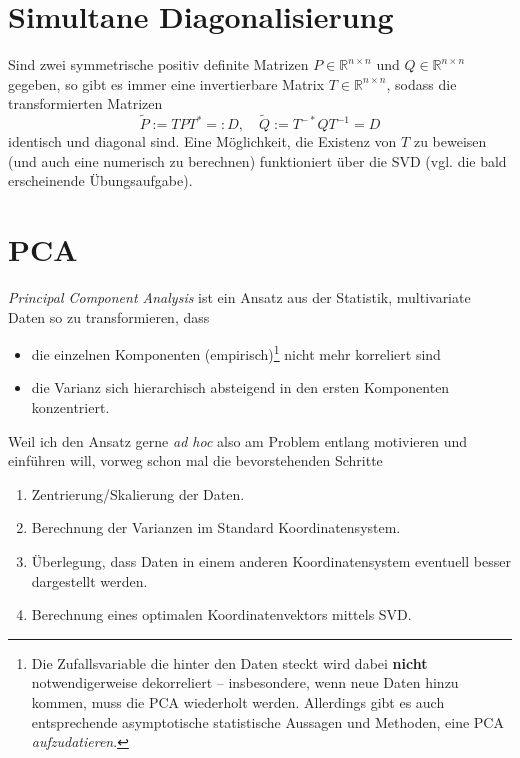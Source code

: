 \documentclass[
]{book}
\providecommand{\tightlist}{%
  \setlength{\itemsep}{0pt}\setlength{\parskip}{0pt}}
\theoremstyle{definition}
\theoremstyle{definition}
\theoremstyle{definition}
\theoremstyle{definition}
\theoremstyle{remark}
\begin{document}
\hypertarget{simultane-diagonalisierung}{%
\section{Simultane Diagonalisierung}\label{simultane-diagonalisierung}}

Sind zwei symmetrische positiv definite Matrizen \(P \in \mathbb R^{n\times n}\)
und \(Q\in \mathbb R^{n\times n}\) gegeben, so gibt es immer eine invertierbare
Matrix \(T\in \mathbb R^{n\times n}\), sodass die transformierten Matrizen
\begin{equation*}
\tilde P := TPT^*=: D, \quad \tilde Q := T^{-*}QT^{-1} = D
\end{equation*}
identisch und diagonal sind.
Eine Möglichkeit, die Existenz von \(T\) zu
beweisen (und auch eine numerisch zu berechnen) funktioniert über die SVD
(vgl. die bald erscheinende Übungsaufgabe).

\hypertarget{pca}{%
\section{PCA}\label{pca}}

\emph{Principal Component Analysis} ist ein Ansatz aus der Statistik, multivariate Daten so zu
transformieren, dass

\begin{itemize}
\tightlist
\item
  die einzelnen Komponenten (empirisch)\footnote{Die Zufallsvariable die hinter den
    Daten steckt wird dabei \textbf{nicht} notwendigerweise dekorreliert -- insbesondere, wenn
    neue Daten hinzu kommen, muss die PCA wiederholt werden. Allerdings gibt es
    auch entsprechende asymptotische statistische Aussagen und Methoden, eine PCA
    \emph{aufzudatieren}.} nicht mehr korreliert sind
\item
  die Varianz sich hierarchisch absteigend in den ersten Komponenten konzentriert.
\end{itemize}

Weil ich den Ansatz gerne \emph{ad hoc} also am Problem entlang motivieren und einführen will, vorweg schon mal die bevorstehenden Schritte

\begin{enumerate}
\def\labelenumi{\arabic{enumi}.}
\tightlist
\item
  Zentrierung/Skalierung der Daten.
\item
  Berechnung der Varianzen im Standard Koordinatensystem.
\item
  Überlegung, dass Daten in einem anderen Koordinatensystem eventuell besser dargestellt werden.
\item
  Berechnung eines optimalen Koordinatenvektors mittels SVD.
\end{enumerate}
\end{document}
